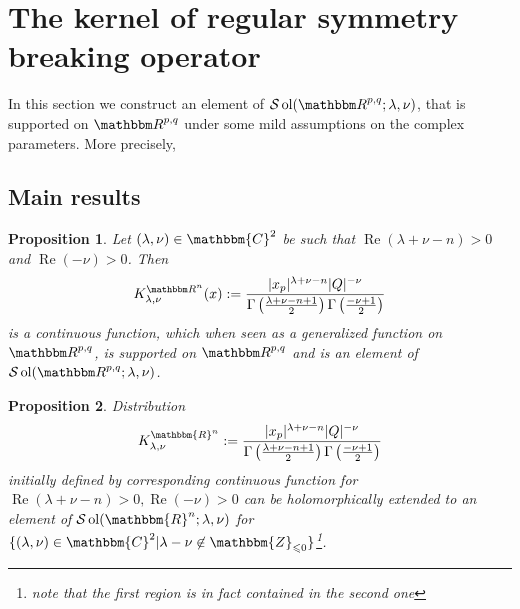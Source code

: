 \documentclass{article}
\newcommand{\assign}{:=}
\newcommand{\nin}{\not\in}
\newcommand{\tmop}[1]{\ensuremath{\operatorname{#1}}}
\newcommand{\um}{-}
\numberwithin{definition}{section}
\numberwithin{lemma}{section}
\newtheorem{proposition}{Proposition}
\numberwithin{proposition}{section}
{\theorembodyfont{\rmfamily}\newtheorem{remark}{Remark}
\numberwithin{remark}{section}
}
\newcommand{\C}{{\mathbbm{C}}}\newcommand{\Z}{{\mathbbm{Z}}}
\begin{document}
\section{The kernel of regular symmetry breaking operator}\label{sec:supp-R}

In this section we construct an element of $\mathcal{S} \tmop{ol} ( \R^{p, q}
; \lambda, \nu)$, that is supported on $\R^{p, q}$ under some mild assumptions
on the complex parameters. More precisely,

\subsection{Main results}

\begin{proposition}
  \label{supp-R:prop-regular}Let $(\lambda, \nu) \in \C^2$ be such that
  $\tmop{Re} (\lambda + \nu - n) > 0$ and $\tmop{Re} (- \nu) > 0$. Then
  \[ K_{\lambda, \nu}^{\R^n} (x) \assign \frac{| x_p |^{\lambda + \nu - n} | Q
     |^{\um \nu}}{\Gamma \left( \frac{\lambda + \nu - n + 1}{2} \right) \Gamma
     \left( \frac{- \nu + 1}{2} \right)} \]
  is a continuous function, which when seen as a generalized function on
  $\R^{p, q}$, is supported on $\R^{p, q}$ and is an element of $\mathcal{S}
  \tmop{ol} ( \R^{p, q} ; \lambda, \nu)$.
\end{proposition}

\begin{proposition}
  \label{supp-R:prop-3}Distribution
  \[ K^{\mathbbm{R}^n}_{\lambda, \nu} \assign \frac{| x_p |^{\lambda + \nu -
     n} | Q |^{\um \nu}}{\Gamma \left( \frac{\lambda + \nu - n + 1}{2} \right)
     \Gamma \left( \frac{- \nu + 1}{2} \right)} \]
  initially defined by corresponding continuous function for $\tmop{Re} (
  \lambda + \nu - n) > 0, \tmop{Re} ( - \nu) > 0$ can be holomorphically
  extended to an element of $\mathcal{S} \tmop{ol} ( \mathbbm{R}^n ; \lambda,
  \nu)$ for $\{ ( \lambda, \nu) \in \mathbbm{C}^2 | \lambda \um \nu \nin
  \mathbbm{Z}_{\leqslant 0} \}${\footnote{note that the first region is in
  fact contained in the second one}}.
\end{proposition}
\end{document}
